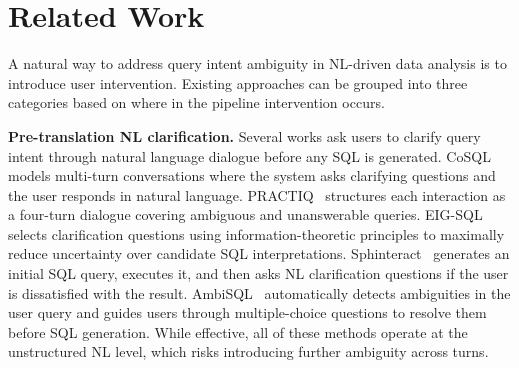 
\section{Related Work}
\label{sec:related}

A natural way to address query intent ambiguity in NL-driven data analysis is to introduce user intervention. Existing approaches can be grouped into three categories based on where in the pipeline intervention occurs.

\vspace{.25em}\noindent\textbf{Pre-translation NL clarification.}
Several works ask users to clarify query intent through natural language dialogue before any SQL is generated. CoSQL~\cite{yu-etal-2019-cosql} models multi-turn conversations where the system asks clarifying questions and the user responds in natural language. PRACTIQ~\cite{dong2025practiq} structures each interaction as a four-turn dialogue covering ambiguous and unanswerable queries. EIG-SQL~\cite{qiu2025eig} selects clarification questions using information-theoretic principles to maximally reduce uncertainty over candidate SQL interpretations. Sphinteract~\cite{zhao2025sphinteract} generates an initial SQL query, executes it, and then asks NL clarification questions if the user is dissatisfied with the result. AmbiSQL~\cite{ding2025ambisql} automatically detects ambiguities in the user query and guides users through multiple-choice questions to resolve them before SQL generation. While effective, all of these methods operate at the unstructured NL level, which risks introducing further ambiguity across turns.

